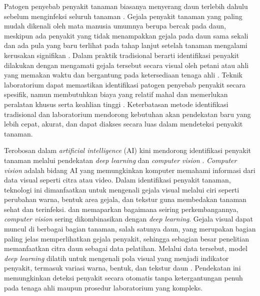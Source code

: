 Patogen penyebab penyakit tanaman biasanya menyerang daun terlebih dahulu sebelum menginfeksi seluruh tanaman \parencite{sharmaClassificationPlantLeaf2020}. Gejala penyakit tanaman yang paling mudah dikenali oleh mata manusia umumnya berupa bercak pada daun, meskipun ada penyakit yang tidak menampakkan gejala pada daun sama sekali dan ada pula yang baru terlihat pada tahap lanjut setelah tanaman mengalami kerusakan signifikan \parencite{upadhyayDeepLearningComputer2025}. Dalam praktik tradisional berarti identifikasi penyakit dilakukan dengan mengamati gejala tersebut secara visual oleh petani atau ahli yang memakan waktu dan bergantung pada ketersediaan tenaga ahli \parencite{bhargavaPlantLeafDisease2024}. Teknik laboratorium dapat memastikan identifikasi patogen penyebab penyakit secara spesifik, namun membutuhkan biaya yang relatif mahal dan memerlukan peralatan khusus serta keahlian tinggi \parencite[Sahu dkk., 2021 dalam ][]{upadhyayDeepLearningComputer2025}. Keterbatasan metode identifikasi tradisional dan laboratorium mendorong kebutuhan akan pendekatan baru yang lebih cepat, akurat, dan dapat diakses secara luas dalam mendeteksi penyakit tanaman.

Terobosan dalam \textit{artificial intelligence} (AI) kini mendorong identifikasi penyakit tanaman melalui pendekatan \textit{deep learning} dan \textit{computer vision} \parencite{upadhyayDeepLearningComputer2025}. \textit{Computer vision} adalah bidang AI yang memungkinkan komputer memahami informasi dari data visual seperti citra atau video. Dalam identifikasi penyakit tanaman, teknologi ini dimanfaatkan untuk mengenali gejala visual melalui ciri seperti perubahan warna, bentuk area gejala, dan tekstur guna membedakan tanaman sehat dan terinfeksi. \textcite{bhargavaPlantLeafDisease2024} dan \textcite{upadhyayDeepLearningComputer2025} memaparkan bagaimana seiring perkembangannya, \textit{computer vision} sering dikombinasikan dengan \textit{deep learning}. Gejala visual dapat muncul di berbagai bagian tanaman, salah satunya daun, yang merupakan bagian paling jelas memperlihatkan gejala penyakit, sehingga sebagian besar penelitian memanfaatkan citra daun sebagai data pelatihan. Melalui data tersebut, model \textit{deep learning} dilatih untuk mengenali pola visual yang menjadi indikator penyakit, termasuk variasi warna, bentuk, dan tekstur daun \parencite{ramanjotPlantDiseaseDetection2023}. Pendekatan ini memungkinkan deteksi penyakit secara otomatis tanpa ketergantungan penuh pada tenaga ahli maupun prosedur laboratorium yang kompleks.

